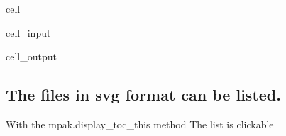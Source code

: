 \documentclass[letterpaper,10pt,english]{jupyterBook}
\begin{document}
\begin{sphinxuseclass}{cell}\begin{sphinxVerbatimInput}

\begin{sphinxuseclass}{cell_input}
\begin{sphinxVerbatim}[commandchars=\\\{\}]
     
\end{sphinxVerbatim}

\end{sphinxuseclass}\end{sphinxVerbatimInput}
\begin{sphinxVerbatimOutput}

\begin{sphinxuseclass}{cell_output}
\noindent{}

\noindent{}

\end{sphinxuseclass}\end{sphinxVerbatimOutput}

\end{sphinxuseclass}

\subsection{The files in svg format can be listed.}
\label{\detokenize{content/howto/keep/Create and modify charts with keep_plot:the-files-in-svg-format-can-be-listed}}
\sphinxAtStartPar
With the mpak.display\_toc\_this  method
The list is clickable
\end{document}
